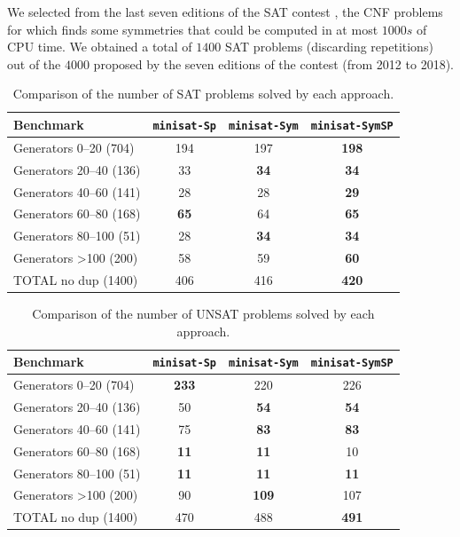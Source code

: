 We selected from the last seven editions of the SAT contest
\cite{jarvisalo2012international}, the CNF problems for which \bliss{} finds
some symmetries that could be computed in at most $1000s$ of CPU time. We
obtained a total of $1400$ SAT problems (discarding repetitions) out of the
$4000$ proposed by the seven editions of the contest (from 2012 to 2018).
\begin{table}\footnotesize
 \centering
 \begin{tabular}{l|ccc}
  \toprule
  Benchmark  &\texttt{minisat-Sp} & \texttt{minisat-Sym} & \texttt{minisat-SymSP}\\
  \hline 
  Generators 0–20 (704) & 194&197&\cellcolor{gray!30,}\textbf{198}\\
  Generators 20–40 (136) & 33&\cellcolor{gray!30}\textbf{34}&\cellcolor{gray!30}\textbf{34}\\
  Generators 40–60 (141) & 28&28&\cellcolor{gray!30}\textbf{29}\\
  Generators 60–80 (168) & \cellcolor{gray!30}\textbf{65}&64&\cellcolor{gray!30}\textbf{65}\\
  Generators 80–100 (51) & 28&\cellcolor{gray!30}\textbf{34}&\cellcolor{gray!30}\textbf{34}\\
  Generators  \textgreater100 (200) & 58&59&\cellcolor{gray!30}\textbf{60}\\
  \hline 
  TOTAL no dup (1400) & 406 & 416 & \cellcolor{gray!30,}\textbf{420}\\
  \bottomrule
 \end{tabular}
 \caption{Comparison of the number of SAT problems solved by each approach.}
 \label{tab:sat}
\end{table}
\begin{table}\footnotesize
 \centering
 \begin{tabular}{l|ccc}
  \toprule
  Benchmark  &\texttt{minisat-Sp} & \texttt{minisat-Sym} & \texttt{minisat-SymSP}\\
  \hline 
  Generators 0–20 (704) & \cellcolor{gray!30,}\textbf{233}&220&226\\
  Generators 20–40 (136) & 50&\cellcolor{gray!30}\textbf{54}&\cellcolor{gray!30}\textbf{54}\\
  Generators 40–60 (141) & 75&\cellcolor{gray!30}\textbf{83}&\cellcolor{gray!30}\textbf{83}\\
  Generators 60–80 (168) & \cellcolor{gray!30}\textbf{11}&\cellcolor{gray!30}\textbf{11}&10\\
  Generators 80–100 (51) & \cellcolor{gray!30}\textbf{11}&\cellcolor{gray!30}\textbf{11}&\cellcolor{gray!30}\textbf{11}\\
  Generators \textgreater100 (200) & 90&\cellcolor{gray!30,}\textbf{109}&107\\
  \hline 
  TOTAL no dup (1400) & 470&488&\cellcolor{gray!30,}\textbf{491}\\
  \bottomrule
 \end{tabular}
 \caption{Comparison of the number of UNSAT problems solved by each approach.}
 \label{tab:unsat}
\end{table}

